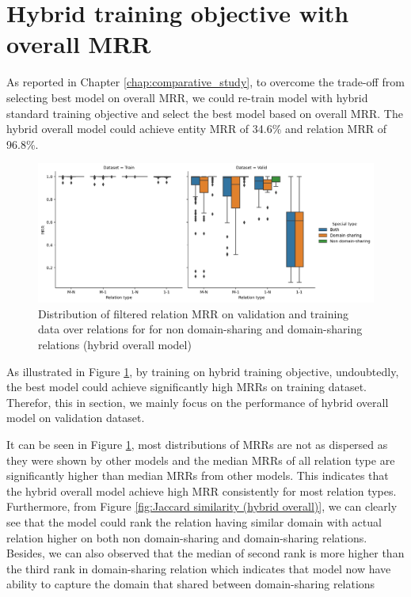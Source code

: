\section{Hybrid training objective with overall MRR}

As reported in Chapter \ref{chap:comparative_study}, to overcome the trade-off from selecting best model on overall MRR, we could re-train model with hybrid standard training objective and select the best model based on overall MRR. The hybrid overall model could achieve entity MRR of 34.6\% and relation MRR of 96.8\%.

\begin{figure}[!htbp]
	\begin{center}
	\includegraphics[width=\linewidth]{Images/MRR_relation_in_so_pairs (hybrid overall).png}
	\caption[Distribution of filtered relation MRR (hybrid overall)]{Distribution of filtered relation MRR on validation and training data over relations for for non domain-sharing and domain-sharing relations (hybrid overall model)}
	\label{fig:MRR relation in so pairs (hybrid overall)}
	\end{center}
\end{figure}

As illustrated in Figure \ref{fig:MRR relation in so pairs (hybrid overall)}, by training on hybrid training objective, undoubtedly, the best model could achieve significantly high MRRs on training dataset. Therefor, this in section, we mainly focus on the performance of hybrid overall model on validation dataset. 

It can be seen in Figure \ref{fig:MRR relation in so pairs (hybrid overall)}, most distributions of MRRs are not as dispersed as they were shown by other models and the median MRRs of all relation type are significantly higher than median MRRs from other models. This indicates that the hybrid overall model achieve high MRR consistently for most relation types. Furthermore, from Figure \ref{fig:Jaccard similarity (hybrid overall)}, we can clearly see that the model could rank the relation having similar domain with actual relation higher on both non domain-sharing and domain-sharing relations. Besides, we can also observed that the median of second rank is more higher than the third rank in domain-sharing relation which indicates that model now have ability to capture the domain that shared between domain-sharing relations


